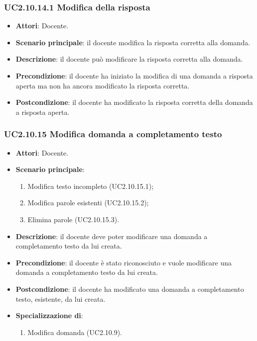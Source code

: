 \subsubsection{UC2.10.14.1 Modifica della risposta}
\begin{itemize}
\item \textbf{Attori}: Docente.
\item \textbf{Scenario principale}: il docente modifica la risposta corretta alla domanda.
\item \textbf{Descrizione}: il docente può modificare la risposta corretta alla domanda.
\item \textbf{Precondizione}: il docente ha iniziato la modifica di una domanda a risposta aperta ma non ha ancora modificato la risposta corretta.
\item \textbf{Postcondizione}: il docente ha modificato la risposta corretta della domanda a risposta aperta.
\end{itemize}
\subsubsection{UC2.10.15 Modifica domanda a completamento testo}
\begin{itemize}
\item \textbf{Attori}: Docente.
\item \textbf{Scenario principale}:
\begin{enumerate}
\item Modifica testo incompleto (UC2.10.15.1);
\item Modifica parole esistenti (UC2.10.15.2);
\item Elimina parole (UC2.10.15.3).
\end{enumerate}
\item \textbf{Descrizione}: il docente deve poter modificare una domanda a completamento testo da lui creata.
\item \textbf{Precondizione}: il docente è stato riconosciuto e vuole modificare una domanda a completamento testo da lui creata.
\item \textbf{Postcondizione}: il docente ha modificato una domanda a completamento testo, esistente, da lui creata.
\item \textbf{Specializzazione di}:
\begin{enumerate}
\item Modifica domanda (UC2.10.9).
\end{enumerate}
\end{itemize}
